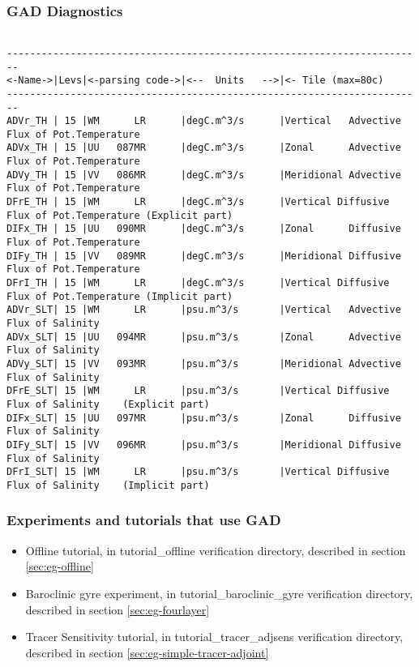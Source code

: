 \subsubsection{GAD Diagnostics}
\label{sec:pkg:gad:diagnostics}

{\footnotesize
\begin{verbatim}

------------------------------------------------------------------------
<-Name->|Levs|<-parsing code->|<--  Units   -->|<- Tile (max=80c) 
------------------------------------------------------------------------
ADVr_TH | 15 |WM      LR      |degC.m^3/s      |Vertical   Advective Flux of Pot.Temperature
ADVx_TH | 15 |UU   087MR      |degC.m^3/s      |Zonal      Advective Flux of Pot.Temperature
ADVy_TH | 15 |VV   086MR      |degC.m^3/s      |Meridional Advective Flux of Pot.Temperature
DFrE_TH | 15 |WM      LR      |degC.m^3/s      |Vertical Diffusive Flux of Pot.Temperature (Explicit part)
DIFx_TH | 15 |UU   090MR      |degC.m^3/s      |Zonal      Diffusive Flux of Pot.Temperature
DIFy_TH | 15 |VV   089MR      |degC.m^3/s      |Meridional Diffusive Flux of Pot.Temperature
DFrI_TH | 15 |WM      LR      |degC.m^3/s      |Vertical Diffusive Flux of Pot.Temperature (Implicit part)
ADVr_SLT| 15 |WM      LR      |psu.m^3/s       |Vertical   Advective Flux of Salinity
ADVx_SLT| 15 |UU   094MR      |psu.m^3/s       |Zonal      Advective Flux of Salinity
ADVy_SLT| 15 |VV   093MR      |psu.m^3/s       |Meridional Advective Flux of Salinity
DFrE_SLT| 15 |WM      LR      |psu.m^3/s       |Vertical Diffusive Flux of Salinity    (Explicit part)
DIFx_SLT| 15 |UU   097MR      |psu.m^3/s       |Zonal      Diffusive Flux of Salinity
DIFy_SLT| 15 |VV   096MR      |psu.m^3/s       |Meridional Diffusive Flux of Salinity
DFrI_SLT| 15 |WM      LR      |psu.m^3/s       |Vertical Diffusive Flux of Salinity    (Implicit part)
\end{verbatim}
}

\subsubsection{Experiments and tutorials that use GAD}
\label{sec:pkg:gad:experiments}

\begin{itemize}
\item{Offline tutorial, in tutorial\_offline verification directory, described in section \ref{sec:eg-offline} }
\item{Baroclinic gyre experiment, in tutorial\_baroclinic\_gyre verification directory, described in 
      section \ref{sec:eg-fourlayer} }
\item{Tracer Sensitivity tutorial, in tutorial\_tracer\_adjsens verification directory, described in 
      section \ref{sec:eg-simple-tracer-adjoint} }
\end{itemize}
